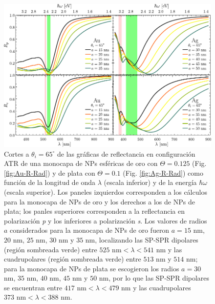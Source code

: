 	\begin{figure}[h!]\centering
	\includegraphics[scale=1]{2-Resultados/figs/8-AurVar/0-cut65_Au_Aug.pdf}\vspace*{-.5em}
	\caption{Cortes a $\theta_i = 65^\circ$ de las gráficas de reflectancia  en configuración ATR  de una monocapa de NPs esféricas de oro con $\Theta=0.125$ (Fig. \ref{fig:Au-R-Rad}) y de plata con $\Theta=0.1$ (Fig. \ref{fig:Ag-R-Rad}) como función de la longitud de onda $\lambda$ (escala inferior) y de la energía $\hbar\omega$ (escala superior). Los paneles izquierdos corresponden a los cálculos para la monocapa de NPs de oro y los derechos a los de NPs de plata; los panles superiores corresponden a la reflectancia en polarización \emph{p} y los inferiores a polarización \emph{s}. Los valores de radios $a$ considerados para la monocapa de NPs de oro fueron  $a=15$ nm, $20$ nm, $25$ nm, $30$ nm y $35$ nm, localizando las SP-SPR dipolares (región sombreada verde) entre $525\mbox{ nm}<\lambda<541\mbox{ nm}$ y las cuadrupolares  (región sombreada verde) entre $513$ nm y $514$ nm; para la monocapa de NPs de plata se escogieron los radios  $a=30$ nm, $35$ nm, $40$ nm, $45$ nm y $50$ nm, por lo que las SP-SPR dipolares se encuentran entre $417\mbox{ nm}<\lambda<479\mbox{ nm}$ y las cuadrupolares $373\mbox{ nm}<\lambda<388\mbox{ nm}$.}\label{fig:AuAg-Cuts-Rad-65}
	\end{figure}

